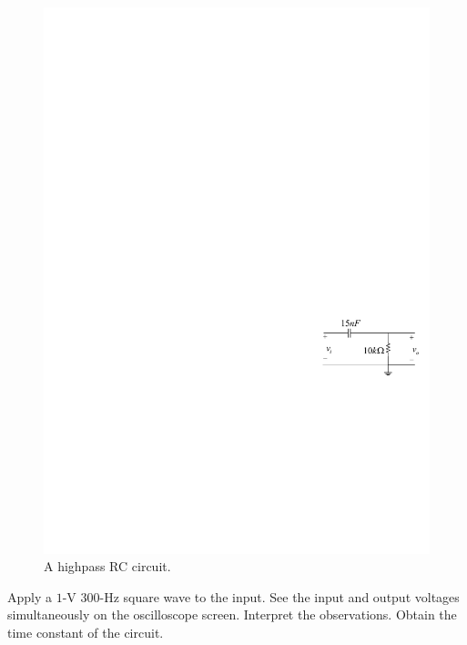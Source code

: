 \documentclass[11pt]{article}
\begin{document}

\begin{question}


    \begin{figure}[H]
        \centering
        \includegraphics[scale=1.2,angle=0]{Fig/cir3.pdf}
        \caption{A highpass RC circuit.} \label{fig:cir3}
    \end{figure}

    \begin{subquestion}{Apply a $1$-V $300$-Hz square wave to the input. See the input and output voltages simultaneously on the oscilloscope screen. Interpret the observations. Obtain the time constant of the circuit.}
        \answer{}
    \end{subquestion}


\end{question}
\end{document}
